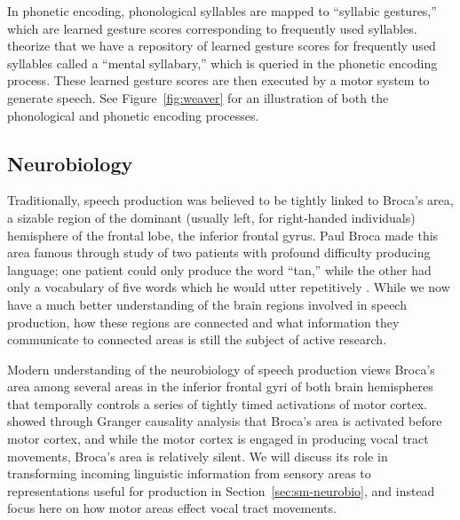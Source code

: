 In phonetic encoding,
phonological syllables are
mapped to ``syllabic gestures,''
which are learned gesture scores
corresponding to frequently used syllables.
\citet{levelt1992,levelt1994} theorize
that we have a repository
of learned gesture scores
for frequently used syllables
called a ``mental syllabary,''
which is queried
in the phonetic encoding process.
These learned gesture scores
are then executed by a motor system
to generate speech.
See Figure~\ref{fig:weaver}
for an illustration of both
the phonological
and phonetic encoding processes.


\subsection{Neurobiology}
\label{sec:prod-neurobio}

Traditionally, speech production
was believed to be tightly linked to Broca's area,
a sizable region of the dominant
(usually left, for right-handed individuals)
hemisphere of the frontal lobe,
the inferior frontal gyrus.
Paul Broca made this area famous
through study of two patients
with profound difficulty producing language;
one patient could only produce the word ``tan,''
while the other had only a vocabulary
of five words which he would utter repetitively
\citep{broca1861}.
While we now have a much better understanding
of the brain regions
involved in speech production,
how these regions are connected
and what information they communicate
to connected areas is still
the subject of active research.

Modern understanding of
the neurobiology of speech production
views Broca's area among several
areas in the inferior frontal gyri
of both brain hemispheres
that temporally controls a series
of tightly timed activations
of motor cortex.
\citet{flinker2015}
showed through Granger causality analysis
that Broca's area is activated
before motor cortex,
and while the motor cortex is
engaged in producing vocal tract movements,
Broca's area is relatively silent.
We will discuss its role in
transforming incoming linguistic
information from sensory areas
to representations useful for production
in Section~\ref{sec:sm-neurobio},
and instead focus here on
how motor areas effect vocal tract movements.

